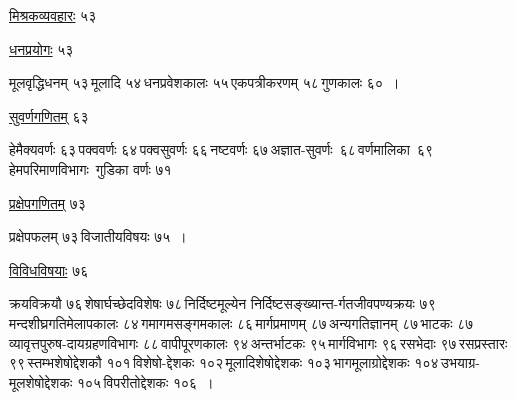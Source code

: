 \documentclass[10pt, openany]{book}
\begin{document}
\noindent \hyperref[47]{मिश्रकव्यवहारः} \hfill ५३ 

\vspace{2mm}

 \hyperref[47]{धनप्रयोगः}  \hfill ५३  

\vspace{2mm}

\begin{minipage}{0.2\textwidth}
\end{minipage}\hspace{4mm}\begin{minipage}{0.76\textwidth}
 मूलवृद्धिधनम् ५३\textemdash \,मूलादि ५४\textemdash \,धनप्रवेशकालः ५५\textemdash \,एकपत्रीकरणम् ५८\textemdash \,गुणकालः ६०~।
\end{minipage}
\afterpage{\fancyhead[LE,RO]{}}
\cfoot{}

\newpage


\noindent \hyperref[52]{सुवर्णगणितम्}  \hfill ६३

\vspace{2mm}

\begin{minipage}{0.8\textwidth}
 हेमैक्यवर्णः ६३\textemdash \,पक्ववर्णः ६४\textemdash \,पक्वसुवर्णः ६६\textemdash \,नष्टवर्णः ६७\textemdash \,अज्ञात-सुवर्णः \,६८\textemdash \,वर्णमालिका \,६९\textemdash \,हेमपरिमाणविभागः \,गुडिका वर्णः ७१ 
\end{minipage}

\vspace{2mm}

\noindent \hyperref[59.1]{प्रक्षेपगणितम्} \hfill ७३

\vspace{2mm}

\begin{minipage}{0.8\textwidth}
 प्रक्षेपफलम् ७३\textemdash \,विजातीयविषयः ७५~। 
\end{minipage}
 
\vspace{2mm}

\noindent \hyperref[60]{विविधविषयाः} \hfill ७६

\vspace{2mm}

\begin{minipage}{0.8\textwidth}
 क्रयविक्रयौ ७६\textemdash \,शेषार्घच्छेदविशेषः ७८\textemdash \,निर्दिष्टमूल्येन निर्दिष्टसङ्ख्यान्त-र्गतजीवपण्यक्रयः ७९\textemdash \,मन्दशीघ्रगतिमेलापकालः ८४\textemdash \,गमागमसङ्गमकालः ८६\textemdash \,मार्गप्रमाणम् ८७\textemdash \,अन्यगतिज्ञानम् ८७\textemdash \,भाटकः ८७\textemdash \,व्यावृत्तपुरुष-दायग्रहणविभागः ८८\textemdash \,वापीपूरणकालः ९४\textemdash \,अन्तर्भाटकः ९५\textemdash \,मार्गविभागः ९६\textemdash \,रसभेदाः ९७\textemdash \,रसप्रस्तारः ९९\textemdash \,स्तम्भशेषोद्देशकौ १०१\textemdash \,विशेषो-द्देशकः १०२\textemdash \,मूलादिशेषोद्देशकः १०३\textemdash \,भागमूलाग्रोद्देशकः १०४\textemdash \,उभयाग्र-मूलशेषोद्देशकः १०५\textemdash \,विपरीतोद्देशकः १०६~। 
 \end{minipage}
\end{document}
